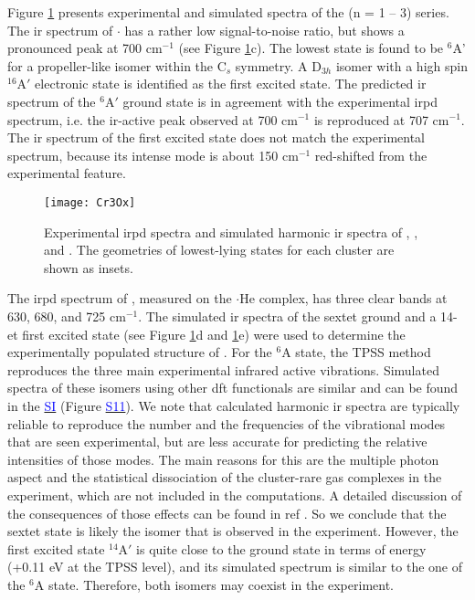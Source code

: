 \begin{refsection}
Figure \ref{fig:Cr3Ox} presents experimental and simulated spectra of the  (n = 1 -- 3) series. The \acrshort{ir} spectrum of $\boldsymbol{\cdot}$ has a rather low signal-to-noise ratio, but shows a pronounced peak at 700 cm$^{-1}$ (see Figure \ref{fig:Cr3Ox}c). The lowest state is found to be $^6$A' for a propeller-like isomer within the C$_s$ symmetry. A D$_{3h}$ isomer with a high spin $^{16}$A$'$ electronic state is identified as the first excited state. The predicted \acrshort{ir} spectrum of the $^6$A$'$ ground state is in agreement with the experimental \acrshort{irpd} spectrum, i.e. the \acrshort{ir}-active peak observed at 700 cm$^{-1}$ is reproduced at 707 cm$^{-1}$. The \acrshort{ir} spectrum of the first excited state does not match the experimental spectrum, because its intense mode is about 150 cm$^{-1}$ red-shifted from the experimental feature.


\begin{figure}[htb!]
	\centering
	\texttt{[image: Cr3Ox]}
	\caption{Experimental \acrshort{irpd} spectra and simulated harmonic \acrshort{ir} spectra of , , and . The geometries of lowest-lying states for each cluster are shown as insets.}
	\label{fig:Cr3Ox}
\end{figure}



The \acrshort{irpd} spectrum of , measured on the $\boldsymbol{\cdot}$He complex, has three clear bands at 630, 680, and  725 cm$^{-1}$. The simulated \acrshort{ir} spectra of the sextet ground and a 14-et first excited state (see Figure \ref{fig:Cr3Ox}d and \ref{fig:Cr3Ox}e) were used to determine the experimentally populated structure of . For the $^6$A state, the TPSS method reproduces the three main experimental infrared active vibrations. Simulated spectra of these isomers using other \acrshort{dft} functionals are similar and can be found in the \href{https://pubs.acs.org/doi/suppl/10.1021/acs.jpcc.8b10035/suppl_file/jp8b10035_si_002.pdf}{\textcolor{blue}{SI}} (Figure \href{https://pubs.acs.org/doi/suppl/10.1021/acs.jpcc.8b10035/suppl_file/jp8b10035_si_002.pdf}{\textcolor{blue}{S11}}). We note that calculated harmonic \acrshort{ir} spectra are typically reliable to reproduce the number and the frequencies of the vibrational modes that are seen experimental, but are less accurate for predicting the relative intensities of those modes. The main reasons for this are the multiple photon aspect and the statistical dissociation of the cluster-rare gas complexes in the experiment, which are not included in the computations. A detailed discussion of the consequences of those effects can be found in ref . So we conclude that the sextet state is likely the isomer that is observed in the experiment. However, the first excited state $^{14}$A$'$ is quite close to the ground state in terms of energy (+0.11 eV at the TPSS level), and its simulated spectrum is similar to the one of the $^6$A state. Therefore, both isomers may coexist in the experiment.   





\end{refsection}
